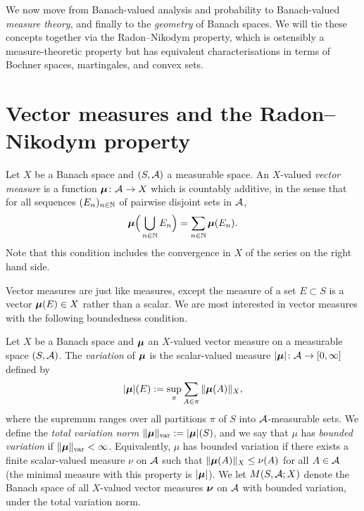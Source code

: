 We now move from Banach-valued analysis and probability to Banach-valued \emph{measure theory}, and finally to the \emph{geometry} of Banach spaces.
We will tie these concepts together via the Radon--Nikodym property, which is ostensibly a measure-theoretic property but has equivalent characterisations in terms of Bochner spaces, martingales, and convex sets.

\section{Vector measures and the Radon--Nikodym property}

\begin{defn}
  Let $X$ be a Banach space and $(S,\mathcal{A})$ a measurable space.
  An $X$-valued \emph{vector measure} is a function $\bm{\mu} \colon \mathcal{A} \rightarrow X$ which is countably additive, in the sense that for all sequences $(E_n)_{n \in \mathbb{N}}$ of pairwise disjoint sets in $\mathcal{A}$,
  \begin{equation*}
    \bm{\mu}\Big( \bigcup_{n \in \mathbb{N}} E_n \Big) = \sum_{n \in \mathbb{N}} \bm{\mu}(E_n).
  \end{equation*}
  Note that this condition includes the convergence in $X$ of the series on the right hand side.
\end{defn}

Vector measures are just like measures, except the measure of a set $E \subset S$ is a vector $\bm{\mu}(E) \in X$ rather than a scalar.
We are most interested in vector measures with the following boundedness condition.

\begin{defn}
  Let $X$ be a Banach space and $\bm{\mu}$ an $X$-valued vector measure on a measurable space $(S,\mathcal{A})$.
  The \emph{variation} of $\bm{\mu}$ is the scalar-valued measure $|\bm{\mu}| \colon \mathcal{A} \rightarrow [0,\infty]$ defined by
  \begin{equation*}
    |\bm{\mu}|(E) := \sup_{\pi} \sum_{A \in \pi} \|\bm{\mu}(A)\|_X,
  \end{equation*}
  where the supremum ranges over all partitions $\pi$ of $S$ into $\mathcal{A}$-measurable sets.
  We define the \emph{total variation norm} $\|\bm{\mu}\|_{\mathrm{var}} := |\bm{\mu}|(S)$, and we say that $\mu$ has \emph{bounded variation} if $\|\bm{\mu}\|_{\mathrm{var}} < \infty$.
  Equivalently, $\mu$ has bounded variation if there exists a finite scalar-valued measure $\nu$ on $\mathcal{A}$ such that $\|\bm{\mu}(A)\|_X \leq \nu(A)$ for all $A \in \mathcal{A}$ (the minimal measure with this property is $|\bm{\mu}|$).
  We let $M(S,\mathcal{A};X)$ denote the Banach space of all $X$-valued vector measures $\bm{\nu}$ on $\mathcal{A}$ with bounded variation, under the total variation norm.
\end{defn}

